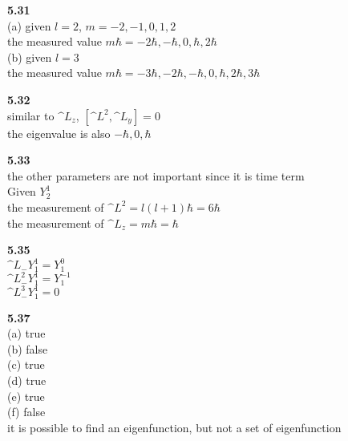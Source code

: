 \documentclass{article}
\begin{document}
\textbf{5.31}\\
(a) given $l = 2$, $m = -2,-1,0,1,2$\\
the measured value $m\hbar = -2\hbar, -\hbar, 0, \hbar, 2\hbar$\\
(b) given $l = 3$\\
the measured value $m\hbar = -3\hbar,-2\hbar, -\hbar, 0, \hbar, 2\hbar, 3\hbar$\\
\newline

\textbf{5.32}\\
similar to $\^{L}_z$, $[\^{L}^2,\^L_y] = 0$\\
the eigenvalue is also $-\hbar, 0, \hbar$\\
\newline

\textbf{5.33}\\
the other parameters are not important since it is time term\\
Given $Y^1_2$\\
the measurement of $\^{L}^2 = l(l+1)\hbar = 6\hbar$\\
the measurement of $\^{L}_z = m\hbar = \hbar$\\
\newline

\textbf{5.35}\\
$\^{L}_{-}Y_1^1 = Y_1^0$\\
$\^{L}^2_{-}Y_1^1 = Y_1^{-1}$\\
$\^{L}^3_{-}Y_1^1 = 0$\\
\newline

\textbf{5.37}\\
(a) true\\
(b) false\\
(c) true\\
(d) true\\
(e) true\\
(f) false\\
it is possible to find an eigenfunction, but not a set of eigenfunction\\
\newline
\end{document}
